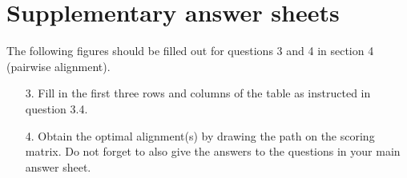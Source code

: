 \documentclass[11pt]{article}
\begin{document}
\setcounter{section}{8}
\section{Supplementary answer sheets}
The following figures should be filled out for questions 3 and 4 in section 4
(pairwise alignment).

\begin{itemize}
\item [3.]   Fill in the first three rows and columns of the table as instructed in
  question 3.4.
  \begin{figure}[H]
    \begin{tikzpicture}[scale=0.8]
      
    \end{tikzpicture}
  \end{figure}

\pagebreak
\item [4.]   Obtain the optimal alignment(s) by drawing the path on the scoring
  matrix. Do not forget to also
  give the answers to the questions in your main answer sheet.
  \begin{figure}[H]
    \begin{tikzpicture}[scale=0.8]
      
    \end{tikzpicture}
  \end{figure}
\end{itemize}
\end{document}
